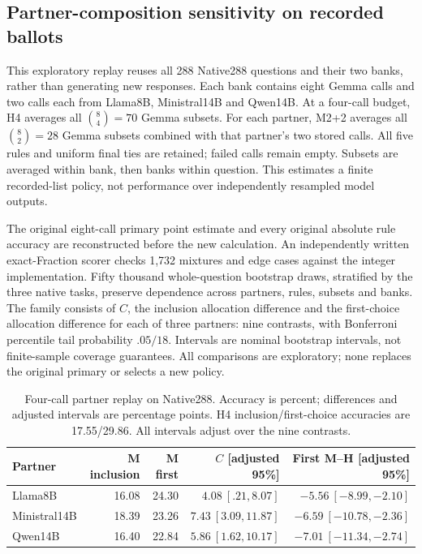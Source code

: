 \subsection{Partner-composition sensitivity on recorded ballots}\label{app:partner_composition}

This exploratory replay reuses all 288 Native288 questions and their two banks, rather than generating new responses. Each bank contains eight Gemma calls and two calls each from Llama8B, Ministral14B and Qwen14B. At a four-call budget, H4 averages all $\binom{8}{4}=70$ Gemma subsets. For each partner, M2+2 averages all $\binom{8}{2}=28$ Gemma subsets combined with that partner's two stored calls. All five rules and uniform final ties are retained; failed calls remain empty. Subsets are averaged within bank, then banks within question. This estimates a finite recorded-list policy, not performance over independently resampled model outputs.

The original eight-call primary point estimate and every original absolute rule accuracy are reconstructed before the new calculation. An independently written exact-Fraction scorer checks 1,732 mixtures and edge cases against the integer implementation. Fifty thousand whole-question bootstrap draws, stratified by the three native tasks, preserve dependence across partners, rules, subsets and banks. The family consists of $C$, the inclusion allocation difference and the first-choice allocation difference for each of three partners: nine contrasts, with Bonferroni percentile tail probability $.05/18$. Intervals are nominal bootstrap intervals, not finite-sample coverage guarantees. All comparisons are exploratory; none replaces the original primary or selects a new policy.

\begin{table}[h]
\centering\small
\caption{Four-call partner replay on Native288. Accuracy is percent; differences and adjusted intervals are percentage points. H4 inclusion/first-choice accuracies are 17.55/29.86. All intervals adjust over the nine contrasts.}
\label{tab:partner_composition}
\begin{tabular}{lrrrr}
\toprule
Partner & M inclusion & M first & $C$ [adjusted 95\%] & First M--H [adjusted 95\%]\\
\midrule
Llama8B &16.08&24.30&$4.08\ [.21,8.07]$&$-5.56\ [-8.99,-2.10]$\\
Ministral14B &18.39&23.26&$7.43\ [3.09,11.87]$&$-6.59\ [-10.78,-2.36]$\\
Qwen14B &16.40&22.84&$5.86\ [1.62,10.17]$&$-7.01\ [-11.34,-2.74]$\\
\bottomrule
\end{tabular}
\end{table}

